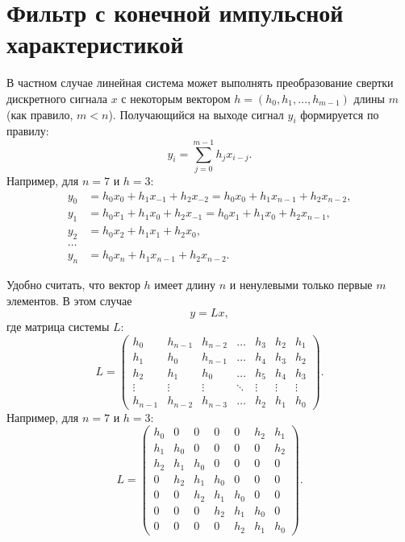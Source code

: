 \section{Фильтр с конечной импульсной характеристикой}

В частном случае линейная система может выполнять преобразование свертки дискретного сигнала $x$ с некоторым вектором $h = ( h_0, h_1, \dots, h_{m-1})$ длины $m$
(как правило, $m < n$). Получающийся на выходе сигнал $y_i$ формируется по правилу:
$$
y_i = \sum_{j=0}^{m-1} h_j x_{i - j}.
$$
Например, для $n=7$ и $h=3$:
\begin{align*}
    y_0 & = h_0 x_0 + h_1 x_{-1}  + h_2 x_{-2} = h_0 x_0 + h_1 x_{n-1}  + h_2 x_{n-2}, \\
    y_1 & = h_0 x_1 + h_1 x_0 + h_2 x_{-1} = h_0 x_1 + h_1 x_0 + h_2 x_{n-1}, \\
    y_2 & = h_0 x_2 + h_1 x_1 + h_2 x_0, \\
    \dots \\
    y_n & = h_0 x_n + h_1 x_{n-1} + h_2 x_{n-2}.
\end{align*}

Удобно считать, что вектор $h$ имеет длину $n$ и ненулевыми только первые $m$ элементов. В этом случае
$$
y = L x ,
$$
где матрица системы $L$:
$$
L =
\begin{pmatrix}
    h_0     & h_{n-1} & h_{n-2} & \dots  & h_3    & h_2    & h_1    \\
    h_1     & h_0     & h_{n-1} & \dots  & h_4    & h_3    & h_2    \\
    h_2     & h_1     & h_0     & \dots  & h_5    & h_4    & h_3    \\
    \vdots  & \vdots  & \vdots  & \ddots & \vdots & \vdots & \vdots \\
    h_{n-1} & h_{n-2} & h_{n-3} & \dots  & h_2    & h_1    & h_0
\end{pmatrix}
.
$$
Например, для $n=7$ и $h=3$:
$$
L =
\begin{pmatrix}
    h_0 & 0   & 0   & 0   & 0   & h_2 & h_1 \\
    h_1 & h_0 & 0   & 0   & 0   & 0   & h_2 \\
    h_2 & h_1 & h_0 & 0   & 0   & 0   & 0   \\
    0   & h_2 & h_1 & h_0 & 0   & 0   & 0   \\
    0   & 0   & h_2 & h_1 & h_0 & 0   & 0   \\
    0   & 0   & 0   & h_2 & h_1 & h_0 & 0   \\
    0   & 0   & 0   & 0   & h_2 & h_1 & h_0
\end{pmatrix}
.
$$

